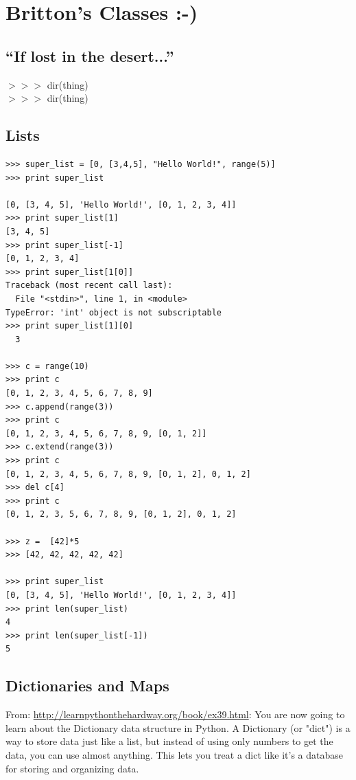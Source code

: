 \documentclass[11pt,a4paper]{article}
\begin{document}
    


\newpage
\section{Britton's Classes :-)}

\subsection{``If lost in the desert...''}
$>>>$ dir(thing) \\
$>>>$ dir(thing) \\




\subsection{Lists}
\begin{lstlisting}
>>> super_list = [0, [3,4,5], "Hello World!", range(5)] 
>>> print super_list 

[0, [3, 4, 5], 'Hello World!', [0, 1, 2, 3, 4]] 
>>> print super_list[1] 
[3, 4, 5] 
>>> print super_list[-1]
[0, 1, 2, 3, 4] 
>>> print super_list[1[0]] 
Traceback (most recent call last):
  File "<stdin>", line 1, in <module>
TypeError: 'int' object is not subscriptable
>>> print super_list[1][0] 
  3

>>> c = range(10) 
>>> print c 
[0, 1, 2, 3, 4, 5, 6, 7, 8, 9]
>>> c.append(range(3)) 
>>> print c 
[0, 1, 2, 3, 4, 5, 6, 7, 8, 9, [0, 1, 2]]
>>> c.extend(range(3)) 
>>> print c 
[0, 1, 2, 3, 4, 5, 6, 7, 8, 9, [0, 1, 2], 0, 1, 2]
>>> del c[4]
>>> print c
[0, 1, 2, 3, 5, 6, 7, 8, 9, [0, 1, 2], 0, 1, 2]

>>> z =  [42]*5
>>> [42, 42, 42, 42, 42]

>>> print super_list
[0, [3, 4, 5], 'Hello World!', [0, 1, 2, 3, 4]]
>>> print len(super_list)
4
>>> print len(super_list[-1])
5
\end{lstlisting}


\subsection{Dictionaries and Maps}
From: \href{http://learnpythonthehardway.org/book/ex39.html}{http://learnpythonthehardway.org/book/ex39.html}: 
You are now going to learn about the Dictionary data structure in
Python. A Dictionary (or "dict") is a way to store data just like a
list, but instead of using only numbers to get the data, you can use
almost anything. This lets you treat a dict like it's a database for
storing and organizing data.
\end{document}
